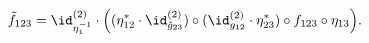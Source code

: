 \begin{equation}
\label{eq_twogauge}
  {\tilde f}_{123} = \id^{(2)}_{\eta_1^{-1}}\cdot\Bigl(
    (\eta_{12}^\ast\cdot \id^{(2)}_{\tilde g_{23}})\circ
    (\id^{(2)}_{g_{12}}\cdot\eta_{23}^\ast)\circ f_{123}\circ\eta_{13}\Bigr).
\end{equation}

